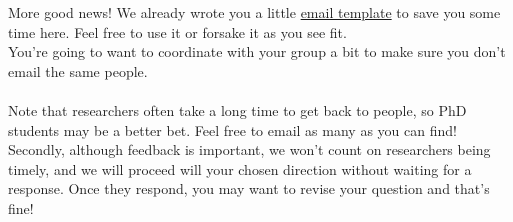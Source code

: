 \documentclass[letterpaper,11pt]{article}
\begin{document}
\begin{enumerate}
More good news! We already wrote you a little \href{https://docs.google.com/document/d/1ewTzFS7NR-LoHK8gTDOEQOODPNarIO47psnZr8DvSTQ/edit?usp=sharing}{email template} to save you some time here. Feel free to use it or forsake it as you see fit. \\
You're going to want to coordinate with your group a bit to make sure you don't email the same people. \\ \\
Note that researchers often take a long time to get back to people, so PhD students may be a better bet. Feel free to email as many as you can find!  Secondly, although feedback is important, we won't count on researchers being timely, and we will proceed will your chosen direction without waiting for a response. Once they respond, you may want to revise your question and that's fine!

\end{enumerate}
\end{document}
